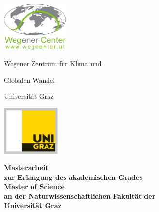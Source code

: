 


\begin{titlepage}

\begin{center}

\vspace*{-2.0cm}
\begin{minipage}[t][2.5cm][c]{0.22\textwidth} 
   \includegraphics[trim=0mm 0mm 0mm 0mm,height=2.5cm]{./logos/logo-wegc-medium.pdf}
\end{minipage}
\hfill
\begin{minipage}[t][2.5cm][c]{0.48\textwidth}
  {\large{\centerline{Wegener Zentrum für Klima und}
          \centerline{Globalen Wandel}
          \vspace{0.2cm}
          \centerline{Universität Graz}}}
\end{minipage}
\hfill
\begin{minipage}[t][2.6cm][c]{0.20\textwidth}
  \includegraphics[trim=0mm 0mm 0mm 0mm,height=2.5cm]{./logos/logo_uni_graz_4c.pdf}
\end{minipage}

 \noindent\hrulefill

  \vspace{1.5cm}

  \thispagestyle{empty}

   {\Large{\textbf{Masterarbeit\\[0.08cm]         
    zur Erlangung des akademischen Grades\\[0.08cm]
    Master of Science\\[0.08cm]
    an der Naturwissenschaftlichen Fakultät der\\[0.08cm]
    Universität Graz\\}}}


\end{center}
\end{titlepage}
